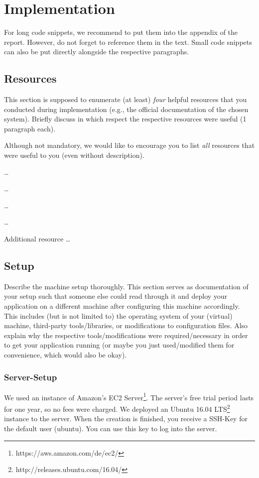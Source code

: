 \section{Implementation}

For long code snippets, we recommend to put them into the appendix of the
report. However, do not forget to reference them in the text. Small code
snippets can also be put directly alongside the respective paragraphs.

\subsection{Resources}

This section is supposed to enumerate (at least) \emph{four} helpful resources
that you conducted during implementation (e.g., the official documentation of
the chosen system). Briefly discuss in which respect the respective resources
were useful (1 paragraph each).

Although not mandatory, we would like to encourage you to list \emph{all}
resources that were useful to you (even without description).

\begin{packed_enum}
   \item \ldots
   \item \ldots
   \item \ldots
   \item \ldots
   \item Additional resource \ldots
\end{packed_enum}

\subsection{Setup}

Describe the machine setup thoroughly. This section serves as documentation of
your setup such that someone else could read through it and deploy your
application on a different machine after configuring this machine accordingly.
This includes (but is not limited to) the operating system of your (virtual)
machine, third-party tools/libraries, or modifications to configuration files.
Also explain why the respective tools/modifications were required/necessary in
order to get your application running (or maybe you just used/modified them for
convenience, which would also be okay).

\subsubsection{Server-Setup}
We used an instance of Amazon's EC2 Server\footnote{https://aws.amazon.com/de/ec2/}. The server's free trial period lasts for one year, so no fees were charged. We deployed an Ubuntu 16.04 LTS\footnote{http://releases.ubuntu.com/16.04/} instance to the server. When the creation is finished, you receive a SSH-Key for the default user (ubuntu). You can use this key to log into the server.

